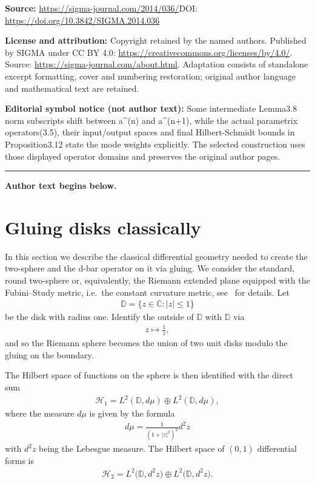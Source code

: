 \documentclass[11pt]{article}
\numberwithin{equation}{section}
\begin{document}
\noindent\textbf{Source:} \url{https://sigma-journal.com/2014/036/}\quad DOI: \url{https://doi.org/10.3842/SIGMA.2014.036}\par
\noindent\textbf{License and attribution:} Copyright retained by the named authors. Published by SIGMA under CC BY 4.0: \url{https://creativecommons.org/licenses/by/4.0/}. Source: \url{https://sigma-journal.com/about.html}. Adaptation consists of standalone excerpt formatting, cover and numbering restoration; original author language and mathematical text are retained.\par
\noindent\textbf{Editorial symbol notice (not author text):} Some intermediate Lemma3.8 norm subscripts shift between a\textasciicircum{}(n) and a\textasciicircum{}(n+\allowbreak{}1), while the actual parametrix operators(3.5), their input/output spaces and final Hilbert-Schmidt bounds in Proposition3.12 state the mode weights explicitly. The selected construction uses those displayed operator domains and preserves the original author pages.\par
\medskip\hrule\medskip\noindent\textbf{Author text begins below.}\par
\setcounter{section}{1}
\setcounter{subsection}{0}
\setcounter{subsubsection}{0}
\setcounter{theo}{0}
\setcounter{equation}{0}
\section{Gluing disks classically}\label{Section2}

In this section we describe the classical dif\/ferential geometry needed to create the two-sphere and the d-bar operator
on it via gluing.
We consider the standard, round two-sphere or, equivalently, the Riemann extended plane equipped with the Fubini--Study
metric, i.e.~the constant curvature metric, see~\cite{Ahlfors} for details.
Let
\begin{gather*}
{\mathbb D} = \{z\in{\mathbb C}: |z|\le 1\}
\end{gather*}
be the disk with radius one.
Identify the outside of ${\mathbb D}$ with ${\mathbb D}$ via
\begin{gather*}
z\mapsto\frac{1}{z},
\end{gather*}
and so the Riemann sphere becomes the union of two unit disks modulo the gluing on the boundary.

The Hilbert space of functions on the sphere is then identif\/ied with the direct sum
\begin{gather*}
\mathcal{H}_1 = L^2({\mathbb D}, d\mu) \oplus L^2({\mathbb D}, d\mu),
\end{gather*}
where the measure $d\mu$ is given by the formula
\begin{gather*}
d\mu = \frac{1}{(1+|z|^2)^2}d^2z
\end{gather*}
with $d^2z$ being the Lebesgue measure.
The Hilbert space of $(0,1)$ dif\/ferential forms is
\begin{gather*}
\mathcal{H}_2 = L^2\big({\mathbb D}, d^2z\big) \oplus L^2\big({\mathbb D}, d^2z\big).
\end{gather*}
\end{document}
